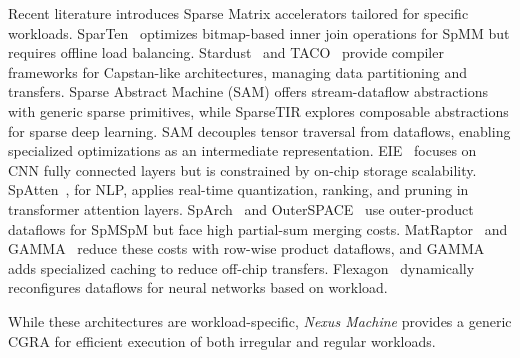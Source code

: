 \begin{comment}
EIE~\cite{eie} specializes in handling the fully connected layers of Convolutional Neural Networks (CNNs). However, it stores all of the matrix data in on-chip storage, limiting its scalability.
Conversely, SpAtten~\cite{spatten} designed for Natural Language Processing (NLP) tasks employs an adaptive approach involving real-time quantization, ranking, and pruning of tokens and attention heads within sparse attention layers found in transformer models.

SpArch~\cite{sparch} and OuterSPACE~\cite{outerspace} accelerate Sparse Matrix Multiplication (SpMSpM) using an outer-product dataflow. It encounters significant challenges due to the high cost associated with output partial sum merging. 
MatRaptor~\cite{matraptor} and GAMMA~\cite{gamma}, like the \textit{Nexus Machine} leverage a row-wise product dataflow to alleviate the high merging costs. 
GAMMA incorporates a specialized cache component to reduce off-chip data transfers and memory bottlenecks in sparse operations. 
Flexagon~\cite{flexagon} proposed an adaptive architecture combining multiple SpMSpM dataflow strategies for neural networks, dynamically reconfiguring its interconnects based on workload characteristics.

These architectures are highly specialized for their respective workloads. In contrast, \textit{Nexus Machine} offers a generic CGRA architecture, enabling efficient execution of irregular and regular workloads.
\end{comment}

Recent literature introduces Sparse Matrix accelerators tailored for specific workloads.
SparTen~\cite{sparten} optimizes bitmap-based inner join operations for SpMM but requires offline load balancing.
Stardust~\cite{stardust} and TACO~\cite{taco} provide compiler frameworks for Capstan-like architectures, managing data partitioning and transfers. Sparse Abstract Machine (SAM)\cite{sam} offers stream-dataflow abstractions with generic sparse primitives, while SparseTIR\cite{sparsetir} explores composable abstractions for sparse deep learning. SAM decouples tensor traversal from dataflows, enabling specialized optimizations as an intermediate representation.
EIE~\cite{eie} focuses on CNN fully connected layers but is constrained by on-chip storage scalability. SpAtten~\cite{spatten}, for NLP, applies real-time quantization, ranking, and pruning in transformer attention layers.
SpArch~\cite{sparch} and OuterSPACE~\cite{outerspace} use outer-product dataflows for SpMSpM but face high partial-sum merging costs. MatRaptor~\cite{matraptor} and GAMMA~\cite{gamma} reduce these costs with row-wise product dataflows, and GAMMA adds specialized caching to reduce off-chip transfers.
Flexagon~\cite{flexagon} dynamically reconfigures dataflows for neural networks based on workload.

While these architectures are workload-specific, \textit{Nexus Machine} provides a generic CGRA for efficient execution of both irregular and regular workloads.